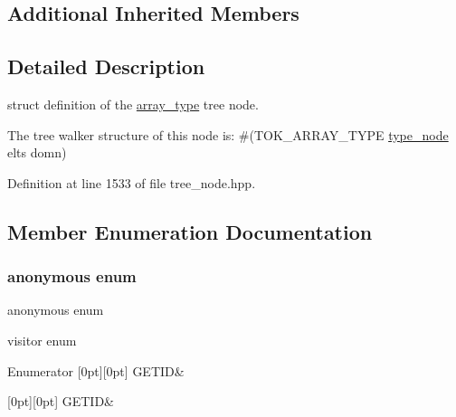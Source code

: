 \subsection*{Additional Inherited Members}


\subsection{Detailed Description}
struct definition of the \hyperlink{structarray__type}{array\+\_\+type} tree node. 

The tree walker structure of this node is\+: \#(T\+O\+K\+\_\+\+A\+R\+R\+A\+Y\+\_\+\+T\+Y\+PE \hyperlink{structtype__node}{type\+\_\+node} elts domn) 

Definition at line 1533 of file tree\+\_\+node.\+hpp.



\subsection{Member Enumeration Documentation}
\mbox{\label{structarray__type_ac099b86ed315428664e8f433ff7f52fe}} 
\subsubsection{\texorpdfstring{anonymous enum}{anonymous enum}}
{\footnotesize\ttfamily anonymous enum}



visitor enum 

\begin{DoxyEnumFields}{Enumerator}
[0pt][0pt]{}\mbox{\label{structarray__type_ac099b86ed315428664e8f433ff7f52feafab3f68ae1ee999a6426ba34aa22f73b}} 
G\+E\+T\+ID&\\
\hline

[0pt][0pt]{}\mbox{\label{structarray__type_ac099b86ed315428664e8f433ff7f52feafab3f68ae1ee999a6426ba34aa22f73b}} 
G\+E\+T\+ID&\\
\hline

\end{DoxyEnumFields}


